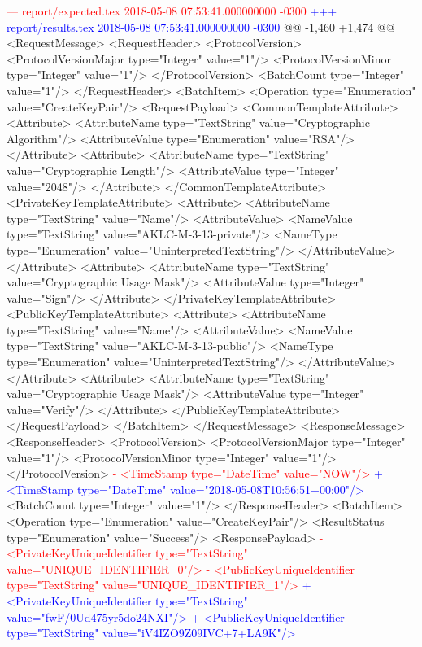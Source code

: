 \textcolor{red}{--- report/expected.tex	2018-05-08 07:53:41.000000000 -0300}
\textcolor{blue}{+++ report/results.tex	2018-05-08 07:53:41.000000000 -0300}
@@ -1,460 +1,474 @@
 <RequestMessage>
   <RequestHeader>
     <ProtocolVersion>
       <ProtocolVersionMajor type="Integer" value="1"/>
       <ProtocolVersionMinor type="Integer" value="1"/>
     </ProtocolVersion>
     <BatchCount type="Integer" value="1"/>
   </RequestHeader>
   <BatchItem>
     <Operation type="Enumeration" value="CreateKeyPair"/>
     <RequestPayload>
       <CommonTemplateAttribute>
         <Attribute>
           <AttributeName type="TextString" value="Cryptographic Algorithm"/>
           <AttributeValue type="Enumeration" value="RSA"/>
         </Attribute>
         <Attribute>
           <AttributeName type="TextString" value="Cryptographic Length"/>
           <AttributeValue type="Integer" value="2048"/>
         </Attribute>
       </CommonTemplateAttribute>
       <PrivateKeyTemplateAttribute>
         <Attribute>
           <AttributeName type="TextString" value="Name"/>
           <AttributeValue>
             <NameValue type="TextString" value="AKLC-M-3-13-private"/>
             <NameType type="Enumeration" value="UninterpretedTextString"/>
           </AttributeValue>
         </Attribute>
         <Attribute>
           <AttributeName type="TextString" value="Cryptographic Usage Mask"/>
           <AttributeValue type="Integer" value="Sign"/>
         </Attribute>
       </PrivateKeyTemplateAttribute>
       <PublicKeyTemplateAttribute>
         <Attribute>
           <AttributeName type="TextString" value="Name"/>
           <AttributeValue>
             <NameValue type="TextString" value="AKLC-M-3-13-public"/>
             <NameType type="Enumeration" value="UninterpretedTextString"/>
           </AttributeValue>
         </Attribute>
         <Attribute>
           <AttributeName type="TextString" value="Cryptographic Usage Mask"/>
           <AttributeValue type="Integer" value="Verify"/>
         </Attribute>
       </PublicKeyTemplateAttribute>
     </RequestPayload>
   </BatchItem>
 </RequestMessage>
 <ResponseMessage>
   <ResponseHeader>
     <ProtocolVersion>
       <ProtocolVersionMajor type="Integer" value="1"/>
       <ProtocolVersionMinor type="Integer" value="1"/>
     </ProtocolVersion>
\textcolor{red}{-    <TimeStamp type="DateTime" value="NOW"/>}
\textcolor{blue}{+    <TimeStamp type="DateTime" value="2018-05-08T10:56:51+00:00"/>}
     <BatchCount type="Integer" value="1"/>
   </ResponseHeader>
   <BatchItem>
     <Operation type="Enumeration" value="CreateKeyPair"/>
     <ResultStatus type="Enumeration" value="Success"/>
     <ResponsePayload>
\textcolor{red}{-      <PrivateKeyUniqueIdentifier type="TextString" value="UNIQUE_IDENTIFIER_0"/>}
\textcolor{red}{-      <PublicKeyUniqueIdentifier type="TextString" value="UNIQUE_IDENTIFIER_1"/>}
\textcolor{blue}{+      <PrivateKeyUniqueIdentifier type="TextString" value="fwF/0Ud475yr5do24NXI"/>
}
\textcolor{blue}{+      <PublicKeyUniqueIdentifier type="TextString" value="iV4IZO9Z09IVC+7+LA9K"/>}

